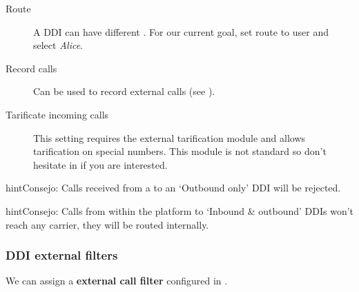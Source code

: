 \documentclass[letterpaper,10pt,spanish]{sphinxmanual}
\begin{document}
\begin{description}
\item[{Route}] \leavevmode{}\label{administration_portal/client/vpbx/ddis:term-route}
A DDI can have different {\hyperref[administration_portal/client/vpbx/ddis:routing\string-logics]{}}. For our
current goal, set route to user and select \emph{Alice}.

\item[{Record calls}] \leavevmode{}\label{administration_portal/client/vpbx/ddis:term-record-calls}
Can be used to record external calls (see {\hyperref[administration_portal/client/vpbx/calls/call_recordings:call\string-recordings]{}}).

\item[{Tarificate incoming calls}] \leavevmode{}\label{administration_portal/client/vpbx/ddis:term-tarificate-incoming-calls}
This setting requires the external tarification module and allows
tarification on special numbers. This module is not standard so don't
hesitate in {\hyperref[basic_concepts/intro/getting_help:getting\string-help]{}} if you are interested.

\end{description}

\begin{notice}{hint}{Consejo:}
Calls received from a {\hyperref[administration_portal/brand/providers/ddi_providers:ddi\string-providers]{}} to an `Outbound only'
DDI will be rejected.
\end{notice}

\begin{notice}{hint}{Consejo:}
Calls from within the platform to `Inbound \& outbound' DDIs won't reach
any carrier, they will be routed internally.
\end{notice}


\subsubsection{DDI external filters}
\label{administration_portal/client/vpbx/ddis:ddi-external-filters}
We can assign a \textbf{external call filter} configured in {\hyperref[administration_portal/client/vpbx/routing_tools/external_call_filters:external\string-call\string-filters]{}}.
\end{document}
